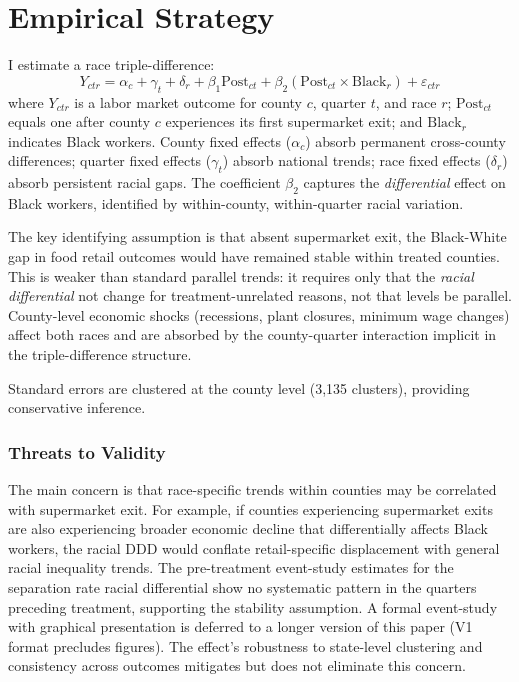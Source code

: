 \documentclass[12pt]{article}
\begin{document}
\section{Empirical Strategy}

I estimate a race triple-difference:
\begin{equation}
Y_{ctr} = \alpha_c + \gamma_t + \delta_r + \beta_1 \text{Post}_{ct} + \beta_2 (\text{Post}_{ct} \times \text{Black}_r) + \varepsilon_{ctr}
\end{equation}
where $Y_{ctr}$ is a labor market outcome for county $c$, quarter $t$, and race $r$; $\text{Post}_{ct}$ equals one after county $c$ experiences its first supermarket exit; and $\text{Black}_r$ indicates Black workers. County fixed effects ($\alpha_c$) absorb permanent cross-county differences; quarter fixed effects ($\gamma_t$) absorb national trends; race fixed effects ($\delta_r$) absorb persistent racial gaps. The coefficient $\beta_2$ captures the \textit{differential} effect on Black workers, identified by within-county, within-quarter racial variation.

The key identifying assumption is that absent supermarket exit, the Black-White gap in food retail outcomes would have remained stable within treated counties. This is weaker than standard parallel trends: it requires only that the \textit{racial differential} not change for treatment-unrelated reasons, not that levels be parallel. County-level economic shocks (recessions, plant closures, minimum wage changes) affect both races and are absorbed by the county-quarter interaction implicit in the triple-difference structure.

Standard errors are clustered at the county level (3,135 clusters), providing conservative inference.

\subsubsection*{Threats to Validity} The main concern is that race-specific trends within counties may be correlated with supermarket exit. For example, if counties experiencing supermarket exits are also experiencing broader economic decline that differentially affects Black workers, the racial DDD would conflate retail-specific displacement with general racial inequality trends. The pre-treatment event-study estimates for the separation rate racial differential show no systematic pattern in the quarters preceding treatment, supporting the stability assumption. A formal event-study with graphical presentation is deferred to a longer version of this paper (V1 format precludes figures). The effect's robustness to state-level clustering and consistency across outcomes mitigates but does not eliminate this concern.
\end{document}
